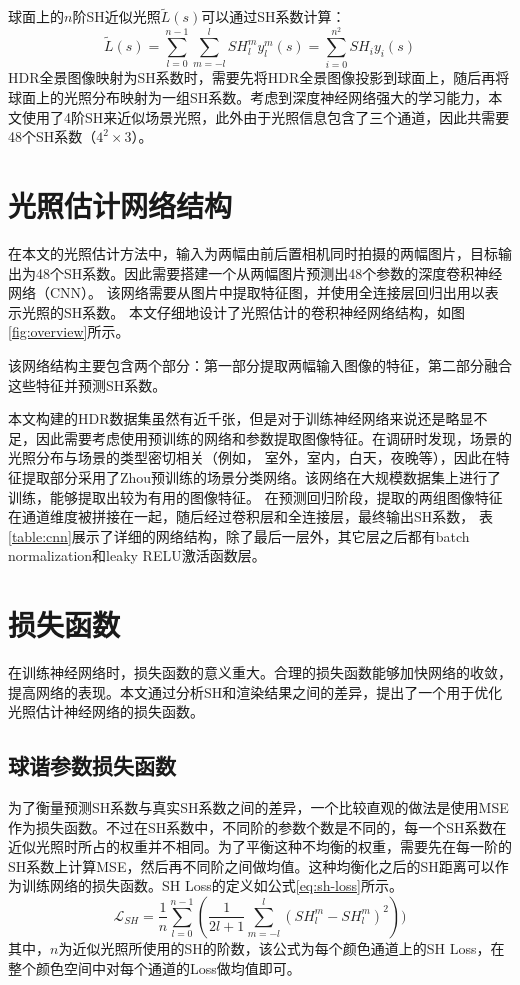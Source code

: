球面上的$n$阶SH近似光照$\tilde{L}(s)$可以通过SH系数计算：
\begin{equation}
    \tilde{L}(s)=\sum_{l=0}^{n-1}\sum_{m=-l}^{l}SH^m_ly^m_l(s)=\sum_{i=0}^{n^2}SH_iy_i(s)
\end{equation}
HDR全景图像映射为SH系数时，需要先将HDR全景图像投影到球面上，随后再将球面上的光照分布映射为一组SH系数。考虑到深度神经网络强大的学习能力，本文使用了4阶SH来近似场景光照，此外由于光照信息包含了三个通道，因此共需要48个SH系数（$4^2\times3$）。
\section{光照估计网络结构}
在本文的光照估计方法中，输入为两幅由前后置相机同时拍摄的两幅图片，目标输出为48个SH系数。因此需要搭建一个从两幅图片预测出48个参数的深度卷积神经网络（CNN）。
该网络需要从图片中提取特征图，并使用全连接层回归出用以表示光照的SH系数。
本文仔细地设计了光照估计的卷积神经网络结构，如图\ref{fig:overview}所示。



该网络结构主要包含两个部分：第一部分提取两幅输入图像的特征，第二部分融合这些特征并预测SH系数。 

本文构建的HDR数据集虽然有近千张，但是对于训练神经网络来说还是略显不足，因此需要考虑使用预训练的网络和参数提取图像特征。在调研时发现，场景的光照分布与场景的类型密切相关（例如， 室外，室内，白天，夜晚等），因此在特征提取部分采用了Zhou预训练的场景分类网络\cite{zhou2017places}。该网络在大规模数据集上进行了训练，能够提取出较为有用的图像特征。 在预测回归阶段，提取的两组图像特征在通道维度被拼接在一起，随后经过卷积层和全连接层，最终输出SH系数， 表\ref{table:cnn}展示了详细的网络结构，除了最后一层外，其它层之后都有batch normalization和leaky RELU激活函数层。


\section{损失函数}\label{sec:loss-function}
在训练神经网络时，损失函数的意义重大。合理的损失函数能够加快网络的收敛，提高网络的表现。本文通过分析SH和渲染结果之间的差异，提出了一个用于优化光照估计神经网络的损失函数。
\subsection{球谐参数损失函数} 为了衡量预测SH系数与真实SH系数之间的差异，一个比较直观的做法是使用MSE作为损失函数。不过在SH系数中，不同阶的参数个数是不同的，每一个SH系数在近似光照时所占的权重并不相同。为了平衡这种不均衡的权重，需要先在每一阶的SH系数上计算MSE，然后再不同阶之间做均值。这种均衡化之后的SH距离可以作为训练网络的损失函数。SH Loss的定义如公式\ref{eq:sh-loss}所示。
\begin{equation}
    \mathcal{L}_{SH} = \frac{1}{n}\sum_{l=0}^{n-1}(\frac{1}{2l+1}\sum_{m=-l}^{l}(SH^m_l - SH^m_l)^2))
    \label{eq:sh-loss}
\end{equation}
其中，$n$为近似光照所使用的SH的阶数，该公式为每个颜色通道上的SH Loss，在整个颜色空间中对每个通道的Loss做均值即可。

